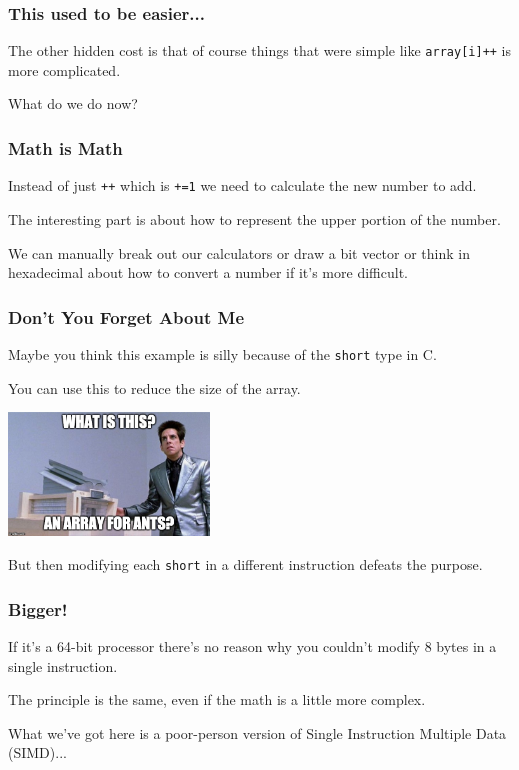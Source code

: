 \begin{frame}
\frametitle{This used to be easier...}

The other hidden cost is that of course things that were simple like \texttt{array[i]++} is more complicated. 

What do we do now?

\end{frame}


\begin{frame}
\frametitle{Math is Math}

Instead of just \texttt{++} which is \texttt{+=1} we need to calculate the new number to add. 

The interesting part is about how to represent the upper portion of the number.

We can manually break out our calculators or draw a bit vector or think in hexadecimal about how to convert a number if it's more difficult.


\end{frame}

\begin{frame}
\frametitle{Don't You Forget About Me}

Maybe you think this example is silly because of the \texttt{short} type in C. 

You can use this to reduce the size of the array.

\begin{center}
	\includegraphics[width=0.4\textwidth]{images/arrayforants.jpg}
\end{center}

But then modifying each \texttt{short} in a different instruction defeats the purpose.

\end{frame}


\begin{frame}
\frametitle{Bigger!}

If it's a 64-bit processor there's no reason why you couldn't modify 8 bytes in a single instruction. 

The principle is the same, even if the math is a little more complex.

What we've got here is a poor-person version of Single Instruction Multiple Data (SIMD)...

\end{frame}



